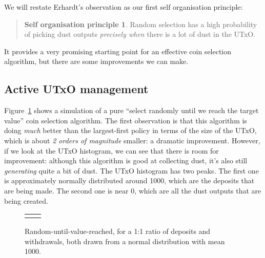 \documentclass{article}
\theoremstyle{definition}{
  \newtheorem{lemma}{Lemma}[section] %
  \newtheorem{definition}[lemma]{Definition}
}
\theoremstyle{theorem}{
  \newtheorem{invariant}[lemma]{Invariant}
  \newtheorem{proofobligation}[lemma]{Proof Obligation}
}
\numberwithin{equation}{lemma}
\begin{document}
We will restate Erhardt's observation as our first self organisation principle:
%
\begin{quote}
\textbf{Self organisation principle 1}. Random selection has a high probability
of picking dust outputs \emph{precisely when} there is a lot of dust in the UTxO.
\end{quote}
%
It provides a very promising starting point for an effective coin selection
algorithm, but there are some improvements we can make.

\subsection{Active UTxO management}

Figure~\ref{fig:inputselection:normal_1to1_randomOff} shows a simulation of a
pure ``select randomly until we reach the target value'' coin selection algorithm.
The first observation is that this algorithm is doing \emph{much} better than
the largest-first policy in terms of the size of the UTxO, which is about
\emph{2 orders of magnitude} smaller: a dramatic improvement. However, if we
look at the UTxO histogram, we can see that there is room for improvement:
although this algorithm is good at collecting dust, it's also still
\emph{generating} quite a bit of dust. The UTxO histogram has two peaks. The
first one is approximately normally distributed around 1000, which are the
deposits that are being made. The second one is near 0, which are all the dust
outputs that are being created.

\begin{figure}[p]
\begin{center}
\scriptsize
\begin{tabular}{ll}
 &

\end{tabular}
\end{center}
\caption{\label{fig:inputselection:normal_1to1_randomOff}
  Random-until-value-reached, for a 1:1 ratio of deposits
  and withdrawals, both drawn from a normal distribution with mean 1000.
}
\end{figure}
\end{document}
